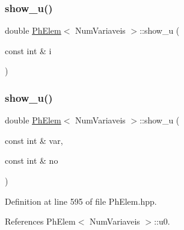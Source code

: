\mbox{\label{classPhElem_a27e7bc9ed0ea64d609d4d0b29baba468}} 
\subsubsection{\texorpdfstring{show\+\_\+u()}{show\_u()}\hspace{0.1cm}{\footnotesize\ttfamily [1/2]}}
{\footnotesize\ttfamily double \hyperlink{classPhElem}{Ph\+Elem}$<$ Num\+Variaveis $>$\+::show\+\_\+u (\begin{DoxyParamCaption}\item[{const int \&}]{i }\end{DoxyParamCaption})\hspace{0.3cm}{\ttfamily [inherited]}}

\mbox{\label{classPhElem_a9d2b7b826289ccd180fdd4b45d0d7333}} 
\subsubsection{\texorpdfstring{show\+\_\+u()}{show\_u()}\hspace{0.1cm}{\footnotesize\ttfamily [2/2]}}
{\footnotesize\ttfamily double \hyperlink{classPhElem}{Ph\+Elem}$<$ Num\+Variaveis $>$\+::show\+\_\+u (\begin{DoxyParamCaption}\item[{const int \&}]{var,  }\item[{const int \&}]{no }\end{DoxyParamCaption})\hspace{0.3cm}{\ttfamily [inherited]}}



Definition at line 595 of file Ph\+Elem.\+hpp.



References Ph\+Elem$<$ Num\+Variaveis $>$\+::u0.

\mbox{\label{classPhElem_ace7e4ec0fa3ca3e829cd790375ab981e}} 
